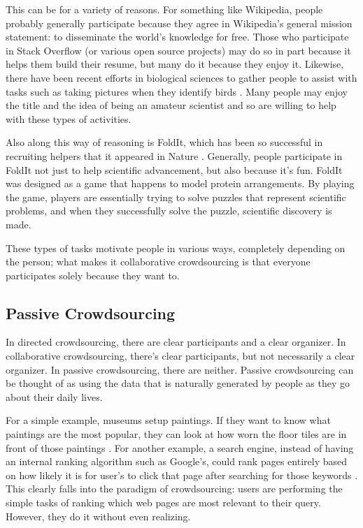 This can be for a variety of reasons. For something like Wikipedia, people probably generally participate because they agree in Wikipedia's general mission statement: to disseminate the world's knowledge for free. Those who participate in Stack Overflow (or various open source projects) may do so in part because it helps them build their resume, but many do it because they enjoy it. Likewise, there have been recent efforts in biological sciences to gather people to assist with tasks such as taking pictures when they identify birds \cite{crowdsourcing}. Many people may enjoy the title and the idea of being an amateur scientist and so are willing to help with these types of activities.

Also along this way of reasoning is FoldIt, which has been so successful in recruiting helpers that it appeared in Nature \cite{foldit}. Generally, people participate in FoldIt not just to help scientific advancement, but also because it's fun. FoldIt was designed as a game that happens to model protein arrangements. By playing the game, players are essentially trying to solve puzzles that represent scientific problems, and when they successfully solve the puzzle, scientific discovery is made.

These types of tasks motivate people in various ways, completely depending on the person; what makes it collaborative crowdsourcing is that everyone participates solely because they want to.

\subsection{Passive Crowdsourcing}
In directed crowdsourcing, there are clear participants and a clear organizer. In collaborative crowdsourcing, there's clear participants, but not necessarily a clear organizer. In passive crowdsourcing, there are neither. Passive crowdsourcing can be thought of as using the data that is naturally generated by people as they go about their daily lives. 

For a simple example, museums setup paintings. If they want to know what paintings are the most popular, they can look at how worn the floor tiles are in front of those paintings \cite{crowdsourcing}. For another example, a search engine, instead of having an internal ranking algorithm such as Google's, could rank pages entirely based on how likely it is for user's to click that page after searching for those keywords \cite{crowdsourcing}. This clearly falls into the paradigm of crowdsourcing: users are performing the simple tasks of ranking which web pages are most relevant to their query. However, they do it without even realizing.

